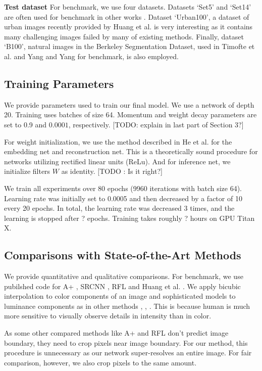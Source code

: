 \documentclass[10pt,twocolumn,letterpaper]{article}
\begin{document}
\textbf{Test dataset} For benchmark, we use four datasets. Datasets `Set5' \cite{bevilacqua2012} and `Set14' \cite{zeyde2012single} are often used for benchmark in other works \cite{Timofte,Timofte2013,Dong2014}. Dataset `Urban100', a dataset of urban images recently provided by Huang et al. \cite{Huang-CVPR-2015} is very interesting as it contains many challenging images failed by many of existing methods. Finally, dataset `B100', natural images in the Berkeley Segmentation Dataset, used in Timofte et al. \cite{Timofte} and Yang and Yang \cite{Yang2013} for benchmark, is also employed. 
\subsection{Training Parameters}
We provide parameters used to train our final model. We use a network of depth 20. Training uses batches of size 64. Momentum and weight decay parameters are set to 0.9 and $0.0001$, respectively. [TODO: explain in last part of Section 3?]

For weight initialization, we use the method described in He et al. \cite{he2015delving} for the embedding net and reconstruction net. This is a theoretically sound procedure for networks utilizing rectified linear units (ReLu). And for inference net, we initialize filters $W$ as identity. [TODO : Is it right?]

We train all experiments over 80 epochs (9960 iterations with batch size 64). Learning rate was initially set to 0.0005 and then decreased by a factor of 10 every 20 epochs. In total, the learning rate was decreased 3 times, and the learning
is stopped after ? epochs. Training takes roughly ? hours on GPU Titan X.


\subsection{Comparisons with State-of-the-Art Methods}
We provide quantitative and qualitative comparisons. For benchmark, we use pubilshed code for A+ \cite{Timofte}, SRCNN \cite{dong2014image}, RFL \cite{schulter2015fast} and  Huang et al. \cite{Huang-CVPR-2015}. We apply bicubic interpolation to color components of an image and sophisticated models to luminance components as in  other methods \cite{chang2004super}, \cite{glasner2009super}, \cite{zeyde2012single}. This is because human is much more sensitive to visually observe details in intensity than in color. 

As  some other compared methods like A+ \cite{Timofte} and  RFL \cite{schulter2015fast} don't predict image boundary, they need to crop pixels near image boundary. For our method, this procedure is unnecessary as our network super-resolves an entire image. For fair comparison, however, we also crop pixels to the same amount. \footnotemark{}
\end{document}
